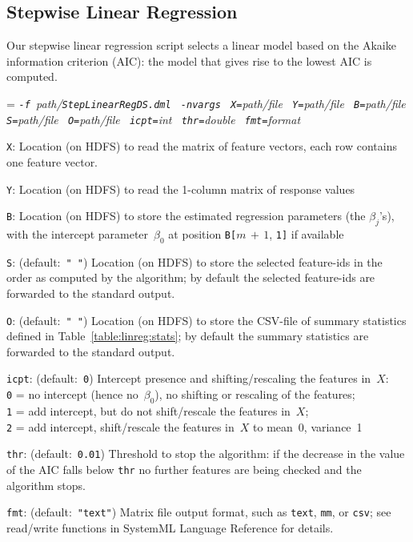 \subsection{Stepwise Linear Regression}

\smallskip

Our stepwise linear regression script selects a linear model based on the Akaike information criterion (AIC): 
the model that gives rise to the lowest AIC is computed. \\

\smallskip
{}
\smallskip

{\hangindent=\parindent\noindent\it%
{\tt{}-f }path/\/{\tt{}StepLinearRegDS.dml}
{\tt{} -nvargs}
{\tt{} X=}path/file
{\tt{} Y=}path/file
{\tt{} B=}path/file
{\tt{} S=}path/file
{\tt{} O=}path/file
{\tt{} icpt=}int
{\tt{} thr=}double
{\tt{} fmt=}format

}

\smallskip
{}
\begin{Description}
\item[{\tt X}:]
Location (on HDFS) to read the matrix of feature vectors, each row contains
one feature vector.
\item[{\tt Y}:]
Location (on HDFS) to read the 1-column matrix of response values
\item[{\tt B}:]
Location (on HDFS) to store the estimated regression parameters (the $\beta_j$'s), with the
intercept parameter~$\beta_0$ at position {\tt B[}$m\,{+}\,1$, {\tt 1]} if available
\item[{\tt S}:] (default:\mbox{ }{\tt " "})
Location (on HDFS) to store the selected feature-ids in the order as computed by the algorithm;
by default the selected feature-ids are forwarded to the standard output.
\item[{\tt O}:] (default:\mbox{ }{\tt " "})
Location (on HDFS) to store the CSV-file of summary statistics defined in
Table~\ref{table:linreg:stats}; by default the summary statistics are forwarded to the standard output.
\item[{\tt icpt}:] (default:\mbox{ }{\tt 0})
Intercept presence and shifting/rescaling the features in~$X$:\\
{\tt 0} = no intercept (hence no~$\beta_0$), no shifting or rescaling of the features;\\
{\tt 1} = add intercept, but do not shift/rescale the features in~$X$;\\
{\tt 2} = add intercept, shift/rescale the features in~$X$ to mean~0, variance~1
\item[{\tt thr}:] (default:\mbox{ }{\tt 0.01})
Threshold to stop the algorithm: if the decrease in the value of the AIC falls below {\tt thr}
no further features are being checked and the algorithm stops.
\item[{\tt fmt}:] (default:\mbox{ }{\tt "text"})
Matrix file output format, such as {\tt text}, {\tt mm}, or {\tt csv};
see read/write functions in SystemML Language Reference for details.
\end{Description}


